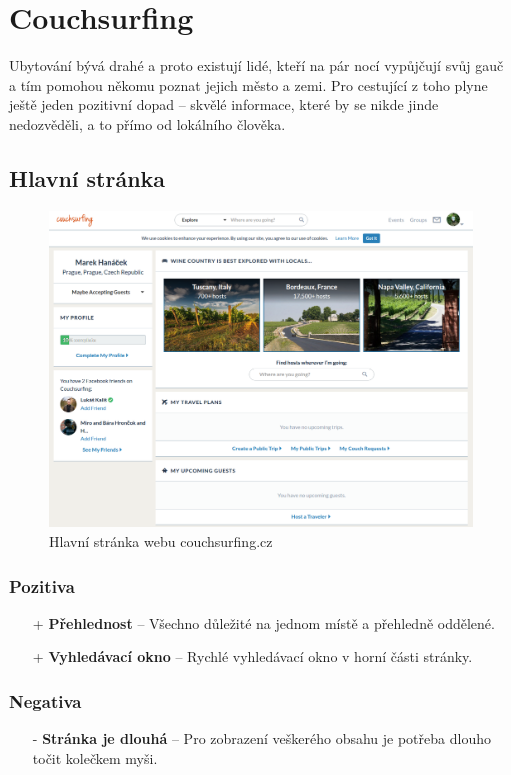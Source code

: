 \section{Couchsurfing \cite{couchsurfing}}
\label{analyza:couchsurfing}

Ubytování bývá drahé a proto existují lidé, kteří na pár nocí vypůjčují svůj gauč a tím pomohou někomu poznat jejich město a zemi. Pro cestující z toho plyne ještě jeden pozitivní dopad -- skvělé informace, které by se nikde jinde nedozvěděli, a to přímo od lokálního člověka.\\

\subsection{Hlavní stránka}
\begin{figure}[h]
    \centering
    \includegraphics[width=1.0\textwidth]{media/couchsurfing/homepage.png}
    \caption{Hlavní stránka webu couchsurfing.cz}
    \label{fig:couchsurfing:homepage}
\end{figure}
\subsubsection*{Pozitiva}
\begin{itemize}
    \item[+] \textbf{Přehlednost} -- Všechno důležité na jednom místě a přehledně oddělené.
    \item[+] \textbf{Vyhledávací okno} -- Rychlé vyhledávací okno v horní části stránky.
\end{itemize}
\subsubsection*{Negativa}
\begin{itemize}
    \item[-] \textbf{Stránka je dlouhá} -- Pro zobrazení veškerého obsahu je potřeba dlouho točit kolečkem myši.
\end{itemize}


